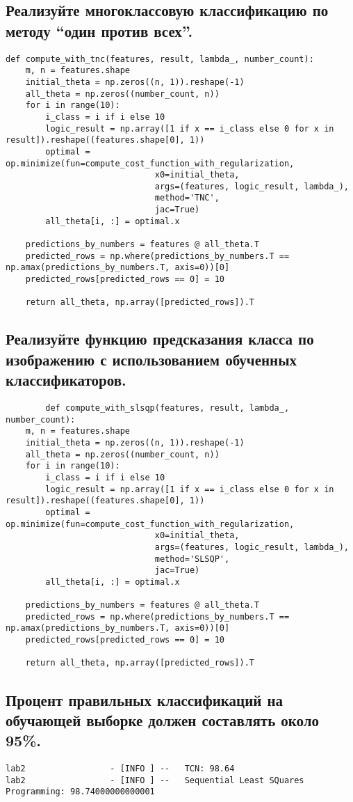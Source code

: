 \subsection{Реализуйте многоклассовую классификацию по методу “один против всех”.}

\begin{lstlisting}
def compute_with_tnc(features, result, lambda_, number_count):
    m, n = features.shape
    initial_theta = np.zeros((n, 1)).reshape(-1)
    all_theta = np.zeros((number_count, n))
    for i in range(10):
        i_class = i if i else 10
        logic_result = np.array([1 if x == i_class else 0 for x in result]).reshape((features.shape[0], 1))
        optimal = op.minimize(fun=compute_cost_function_with_regularization,
                              x0=initial_theta,
                              args=(features, logic_result, lambda_),
                              method='TNC',
                              jac=True)
        all_theta[i, :] = optimal.x

    predictions_by_numbers = features @ all_theta.T
    predicted_rows = np.where(predictions_by_numbers.T == np.amax(predictions_by_numbers.T, axis=0))[0]
    predicted_rows[predicted_rows == 0] = 10

    return all_theta, np.array([predicted_rows]).T
\end{lstlisting}

\subsection{Реализуйте функцию предсказания класса по изображению с использованием обученных классификаторов.}

\begin{lstlisting}
        def compute_with_slsqp(features, result, lambda_, number_count):
    m, n = features.shape
    initial_theta = np.zeros((n, 1)).reshape(-1)
    all_theta = np.zeros((number_count, n))
    for i in range(10):
        i_class = i if i else 10
        logic_result = np.array([1 if x == i_class else 0 for x in result]).reshape((features.shape[0], 1))
        optimal = op.minimize(fun=compute_cost_function_with_regularization,
                              x0=initial_theta,
                              args=(features, logic_result, lambda_),
                              method='SLSQP',
                              jac=True)
        all_theta[i, :] = optimal.x

    predictions_by_numbers = features @ all_theta.T
    predicted_rows = np.where(predictions_by_numbers.T == np.amax(predictions_by_numbers.T, axis=0))[0]
    predicted_rows[predicted_rows == 0] = 10

    return all_theta, np.array([predicted_rows]).T
\end{lstlisting}

\subsection{Процент правильных классификаций на обучающей выборке должен составлять около 95\%.}

\begin{lstlisting}
lab2                 - [INFO ] --   TCN: 98.64
lab2                 - [INFO ] --   Sequential Least SQuares Programming: 98.74000000000001
\end{lstlisting}


